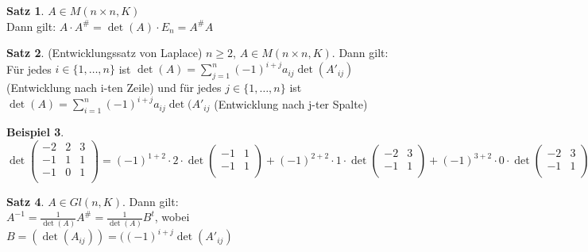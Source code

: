 \documentclass[10pt,a4paper,numbers=endperiod]{scrartcl}
\theoremstyle{definition}
\newtheorem{satz}{Satz}[section]
\newtheorem{bsp}[satz]{Beispiel}
\begin{document}
\begin{satz}
	$A \in M(n\times n, K)$\\
	Dann gilt: $A \cdot A^\# = \det(A) \cdot E_n = A^\#A$
\end{satz}

\begin{satz}
	(Entwicklungssatz von Laplace) $n \geq 2$, $A \in M(n \times n, K)$. Dann gilt:\\
	Für jedes $ i \in \{1, \ldots,n\}$ ist $\det(A) = \sum\limits_{j=1}^{n} (-1)^{i+j} a_{ij} \det(A'_{ij})$ (Entwicklung nach i-ten Zeile) und für jedes $j \in \{1, \ldots,n\}$ ist $\det(A) = \sum\limits_{i = 1}^{n} (-1)^{i+j} a_{ij} \det(A'_{ij}$ (Entwicklung nach j-ter Spalte)
\end{satz}
	
\begin{bsp}
	$ $\\
	
	$\det \begin{pmatrix}
	-2 & 2 & 3\\
	-1 & 1 & 1\\
	-1 & 0 & 1\\
	\end{pmatrix}
	= (-1)^{1+2} \cdot2 \cdot \det \begin{pmatrix}
	-1 & 1\\
	-1 & 1\\
	\end{pmatrix} + (-1)^{2+2} \cdot 1 \cdot \det \begin{pmatrix}
	-2 & 3\\
	-1 & 1\\
	\end{pmatrix} + (-1)^{3+2} \cdot 0 \cdot \det \begin{pmatrix}
	-2 & 3\\
	-1 & 1\\
	\end{pmatrix} = 0 + \det \begin{pmatrix}
	-2 & 3\\
	-1 & 1\\
	\end{pmatrix} + 0 = (-2) \cdot 1 - 3 \cdot (-1) = 1$\\
\end{bsp}
	
\begin{satz}
	$A \in Gl(n,K)$. Dann gilt:\\
	$A^{-1} = \frac{1}{\det(A)}A^\# = \frac{1}{\det(A)} B^t$, wobei $B = (\det(A_{ij})) = (
	(-1)^{i+j} \det (A'_{ij})$
\end{satz}	
\end{document}
